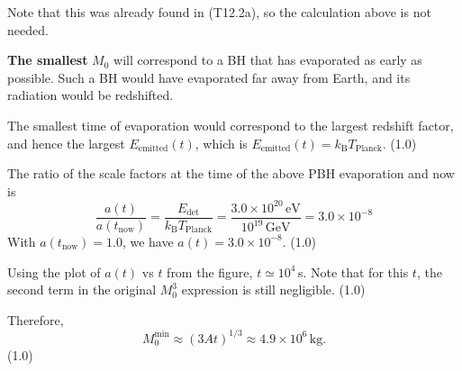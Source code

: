 \begin{description}
  Note that this was already found in (T12.2a), so the calculation above is
  not needed.

  \textbf{The smallest} $M_0$ will correspond to a BH that has evaporated as
  early as possible. Such a BH would have evaporated far away from Earth,
  and its radiation would be redshifted.

  The smallest time of evaporation would correspond to the largest redshift
  factor, and hence the largest $E_{\mathrm{emitted}}(t)$, which is
  $E_{\mathrm{emitted}}(t) = k_{\mathrm{B}} T_{\mathrm{Planck}}$.
  \hfill(1.0)

  The ratio of the scale factors at the time of the above PBH evaporation
  and now is
  \[
    \frac{a(t)}{a(t_{\mathrm{now}})}
    = \frac{E_{\mathrm{det}}}{k_{\mathrm{B}} T_{\mathrm{Planck}}}
    = \frac{3.0 \times 10^{20}\,\mathrm{eV}}{10^{19}\,\mathrm{GeV}}
    = 3.0 \times 10^{-8}
  \]
  With $a(t_{\mathrm{now}}) = 1.0$, we have
  $a(t) = 3.0 \times 10^{-8}$. \hfill(1.0)

  Using the plot of $a(t)$ vs $t$ from the figure, $t \simeq 10^{4}$\,s.
  Note that for this $t$, the second term in the original $M_0^3$ expression
  is still negligible. \hfill(1.0)

  Therefore,
  \[
    M_0^{\mathrm{min}} \approx (3At)^{1/3}
    \approx 4.9 \times 10^{6}\,\mathrm{kg}.
  \]
  \hfill(1.0)
\end{description}

